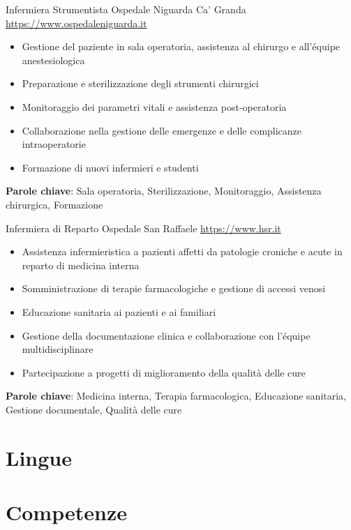 \documentclass[a4paper, serif, 10pt]{moderncv}
\begin{document}
        {Infermiera Strumentista}
        {Ospedale Niguarda Ca' Granda}
        {\url{https://www.ospedaleniguarda.it}}
        {}
        {\begin{itemize}
\item Gestione del paziente in sala operatoria, assistenza al chirurgo e all'équipe anestesiologica
\item Preparazione e sterilizzazione degli strumenti chirurgici
\item Monitoraggio dei parametri vitali e assistenza post-operatoria
\item Collaborazione nella gestione delle emergenze e delle complicanze intraoperatorie
\item Formazione di nuovi infermieri e studenti
\end{itemize}
\textbf{Parole chiave}: Sala operatoria, Sterilizzazione, Monitoraggio, Assistenza chirurgica, Formazione}

        {Infermiera di Reparto}
        {Ospedale San Raffaele}
        {\url{https://www.hsr.it}}
        {}
        {\begin{itemize}
\item Assistenza infermieristica a pazienti affetti da patologie croniche e acute in reparto di medicina interna
\item Somministrazione di terapie farmacologiche e gestione di accessi venosi
\item Educazione sanitaria ai pazienti e ai familiari
\item Gestione della documentazione clinica e collaborazione con l'équipe multidisciplinare
\item Partecipazione a progetti di miglioramento della qualità delle cure
\end{itemize}
\textbf{Parole chiave}: Medicina interna, Terapia farmacologica, Educazione sanitaria, Gestione documentale, Qualità delle cure}
\section{Lingue}

\section{Competenze}
\end{document}
